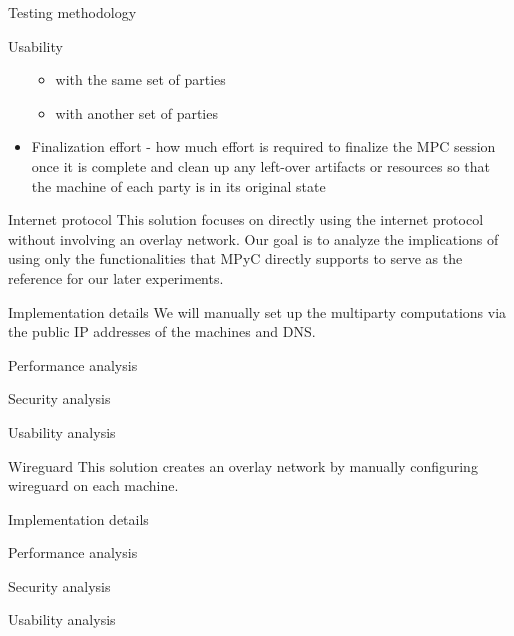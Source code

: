 \begin{frame}{Testing methodology}
\begin{block}{Usability}
\begin{itemize}
  \begin{itemize}
  \tightlist
  \item
    with the same set of parties
  \item
    with another set of parties
  \end{itemize}
\item
  Finalization effort - how much effort is required to finalize the MPC
  session once it is complete and clean up any left-over artifacts or
  resources so that the machine of each party is in its original state
\end{itemize}
\end{block}
\end{frame}

\begin{frame}{Internet protocol}
\protect\hypertarget{internet-protocol}{}
This solution focuses on directly using the internet protocol without
involving an overlay network. Our goal is to analyze the implications of
using only the functionalities that MPyC directly supports to serve as
the reference for our later experiments.

\begin{block}{Implementation details}
\protect\hypertarget{implementation-details}{}
We will manually set up the multiparty computations via the public IP
addresses of the machines and DNS.
\end{block}

\begin{block}{Performance analysis}
\protect\hypertarget{performance-analysis}{}
\end{block}

\begin{block}{Security analysis}
\protect\hypertarget{security-analysis}{}
\end{block}

\begin{block}{Usability analysis}
\protect\hypertarget{usability-analysis}{}
\end{block}
\end{frame}

\begin{frame}{Wireguard}
\protect\hypertarget{wireguard}{}
This solution creates an overlay network by manually configuring
wireguard on each machine.

\begin{block}{Implementation details}
\protect\hypertarget{implementation-details}{}
\end{block}

\begin{block}{Performance analysis}
\protect\hypertarget{performance-analysis}{}
\end{block}

\begin{block}{Security analysis}
\protect\hypertarget{security-analysis}{}
\end{block}

\begin{block}{Usability analysis}
\protect\hypertarget{usability-analysis}{}
\end{block}
\end{frame}

